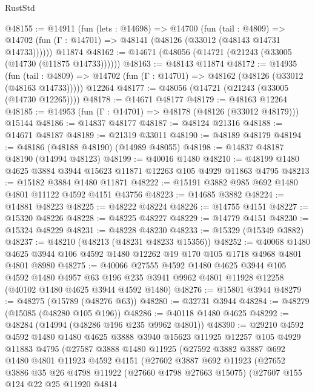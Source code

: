 \begin{lexlean}{RustStd}
\begin{coremodule}
@48155 := @14911
    (fun (lets : @14698) =>
    @14700
      (fun (tail : @4809) =>
      @14702 (fun (Γ : @14701) => @48141 (@48126 (@33012 (@48143 @14731 @14733))))))
    @11874
@48162 := @14671 (@48056 (@14721 (@21243 (@33005 (@14730 (@11875 @14733))))))
@48163 := @48143 @11874
@48172 := @14935
    (fun (tail : @4809) => @14702 (fun (Γ : @14701) => @48162 (@48126 (@33012 (@48163 @14733)))))
    @12264
@48177 := @48056 (@14721 (@21243 (@33005 (@14730 @12265))))
@48178 := @14671 @48177
@48179 := @48163 @12264
@48185 := @14953 (fun (Γ : @14701) => @48178 (@48126 (@33012 @48179))) @15144
@48186 := @14837 @48177
@48187 := @48124 @21316
@48188 := @14671 @48187
@48189 := @21319 @33011
@48190 := @48189 @48179
@48194 := @48186 (@48188 @48190) (@14989 @48055)
@48198 := @14837 @48187 @48190 (@14994 @48123)
@48199 := @40016 @1480
@48210 := @48199 @1480 @4625 @3884 @3944 @15623 @11871 @12263 @105 @4929 @11863 @4795
@48213 := @15182 @3884 @1480 @11871
@48222 := @15191 @3882 @985 @692 @1480 @4801 @11122 @4592 @4151 @43756
@48223 := @14685 @3882
@48224 := @14881 @48223
@48225 := @48222 @48224
@48226 := @14755 @4151
@48227 := @15320 @48226
@48228 := @48225 @48227
@48229 := @14779 @4151
@48230 := @15324 @48229
@48231 := @48228 @48230
@48233 := @15329 (@15349 @3882)
@48237 := @48210 (@48213 (@48231 @48233 @15356))
@48252 := @40068
    @1480
    @4625
    @3944
    @106
    @4592
    @1480
    @12262
    @19
    @170
    @105
    @1718
    @4968
    @4801
    @4801
    @8980
@48275 := @40066
    @27555
    @4592
    @1480
    @4625
    @3944
    @105
    @4592
    @1480
    @4957
    @63
    @196
    @235
    @3941
    @9962
    @4801
    @11928
    @12258
    (@40102 @1480 @4625 @3944 @4592 @1480)
@48276 := @15801 @3944
@48279 := @48275 (@15789 (@48276 @63))
@48280 := @32731 @3944
@48284 := @48279 (@15085 (@48280 @105 @196))
@48286 := @40118 @1480 @4625
@48292 := @48284 (@14994 (@48286 @196 @235 @9962 @4801))
@48390 := @29210
    @4592
    @4592
    @1480
    @1480
    @4625
    @3888
    @3940
    @15623
    @11925
    @12257
    @105
    @4929
    @11883
    @4795
    (@27587
      @3888
      @1480
      @11925
      (@27592
        @3882
        @3887
        @692
        @1480
        @4801
        @11923
        @4592
        @4151
        (@27602
          @3887
          @692
          @11923
          (@27652
            @3886
            @35
            @26
            @4798
            @11922
            (@27660 @4798 @27663 @15075)
            (@27607
              @155
              @124
              @22
              @25
              @11920
              @4814

\end{coremodule}
\end{lexlean}
